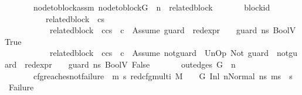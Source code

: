 \begin{isabellebody}
\ \ \ \ \ \ \ node{\isacharunderscore}{\kern0pt}to{\isacharunderscore}{\kern0pt}block{\isacharunderscore}{\kern0pt}assm{\isacharcolon}{\kern0pt}\ {\isachardoublequoteopen}node{\isacharunderscore}{\kern0pt}to{\isacharunderscore}{\kern0pt}block{\isacharparenleft}{\kern0pt}G{\isacharparenright}{\kern0pt}\ {\isacharbang}{\kern0pt}\ n\ {\isacharequal}{\kern0pt}\ related{\isacharunderscore}{\kern0pt}block{\isachardoublequoteclose}\isanewline
\ \ \ \ \ \ \ block{\isacharunderscore}{\kern0pt}id{\isacharcolon}{\kern0pt}\isanewline
\ \ \ \ \ \ \ \ \ \ {\isachardoublequoteopen}{\isacharparenleft}{\kern0pt}related{\isacharunderscore}{\kern0pt}block\ {\isacharequal}{\kern0pt}\ cs{}{\isacharparenright}{\kern0pt}\ {\isasymor}\ \isanewline
\ \ \ \ \ \ \ \ \ \ \ {\isacharparenleft}{\kern0pt}related{\isacharunderscore}{\kern0pt}block\ {\isacharequal}{\kern0pt}\ c{\isacharhash}{\kern0pt}cs{}{\isacharparenright}{\kern0pt}\ {\isasymand}\ c\ {\isacharequal}{\kern0pt}\ Assume\ guard\ {\isasymand}\ {\isacharparenleft}{\kern0pt}red{\isacharunderscore}{\kern0pt}expr\ {\isasymLambda}\ {\isasymGamma}\ {\isasymOmega}\ guard\ ns{}\ {\isacharparenleft}{\kern0pt}BoolV\ True{\isacharparenright}{\kern0pt}{\isacharparenright}{\kern0pt}\ {\isasymor}\ \isanewline
\ \ \ \ \ \ \ \ \ \ \ {\isacharparenleft}{\kern0pt}related{\isacharunderscore}{\kern0pt}block\ {\isacharequal}{\kern0pt}\ c{\isacharhash}{\kern0pt}cs{}{\isacharparenright}{\kern0pt}\ {\isasymand}\ c\ {\isacharequal}{\kern0pt}\ Assume\ not{\isacharunderscore}{\kern0pt}guard\ {\isasymand}\ {\isacharparenleft}{\kern0pt}UnOp\ Not\ guard\ {\isasymsim}\ not{\isacharunderscore}{\kern0pt}guard{\isacharparenright}{\kern0pt}\ {\isasymand}\ {\isacharparenleft}{\kern0pt}red{\isacharunderscore}{\kern0pt}expr\ {\isasymLambda}\ {\isasymGamma}\ {\isasymOmega}\ guard\ ns{}\ {\isacharparenleft}{\kern0pt}BoolV\ False{\isacharparenright}{\kern0pt}{\isacharparenright}{\kern0pt}{\isachardoublequoteclose}\isanewline
\ \ \ \ \ \ \ {\isachardoublequoteopen}out{\isacharunderscore}{\kern0pt}edges\ G\ {\isacharbang}{\kern0pt}\ n\ {\isacharequal}{\kern0pt}\ {\isacharbrackleft}{\kern0pt}{\isacharbrackright}{\kern0pt}{\isachardoublequoteclose}\isanewline
\ \ \ \ \ \ \ cfg{\isacharunderscore}{\kern0pt}reaches{\isacharunderscore}{\kern0pt}not{\isacharunderscore}{\kern0pt}failure{\isacharcolon}{\kern0pt}\ {\isachardoublequoteopen}{\isasymAnd}\ m{\isacharprime}{\kern0pt}\ s{\isacharprime}{\kern0pt}{\isachardot}{\kern0pt}\ {\isacharparenleft}{\kern0pt}red{\isacharunderscore}{\kern0pt}cfg{\isacharunderscore}{\kern0pt}multi\ M\ {\isasymLambda}\ {\isasymGamma}\ {\isasymOmega}\ G\ {\isacharparenleft}{\kern0pt}{\isacharparenleft}{\kern0pt}Inl\ n{\isacharparenright}{\kern0pt}{\isacharcomma}{\kern0pt}{\isacharparenleft}{\kern0pt}Normal\ ns{}{\isacharparenright}{\kern0pt}{\isacharparenright}{\kern0pt}\ {\isacharparenleft}{\kern0pt}m{\isacharprime}{\kern0pt}{\isacharcomma}{\kern0pt}s{\isacharprime}{\kern0pt}{\isacharparenright}{\kern0pt}{\isacharparenright}{\kern0pt}\ {\isasymLongrightarrow}\ {\isacharparenleft}{\kern0pt}s{\isacharprime}{\kern0pt}\ {\isasymnoteq}\ Failure{\isacharparenright}{\kern0pt}{\isachardoublequoteclose}\isanewline

\end{isabellebody}
